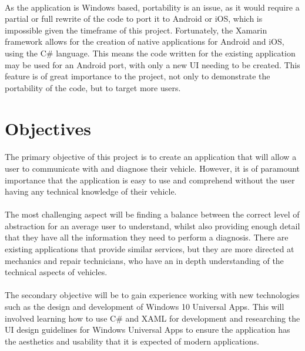 	\paragraph{}{
	As the application is Windows based, portability is an issue, as it would require a partial or full rewrite of the code to port it to Android or iOS, which is impossible given the timeframe of this project. Fortunately, the Xamarin framework allows for the creation of native applications for Android and iOS, using the C{\#} language. This means the code written for the existing application may be used for an Android port, with only a new UI needing to be created. This feature is of great importance to the project, not only to demonstrate the portability of the code, but to target more users.
	}
		
\section{Objectives}
	\paragraph{}{
	The primary objective of this project is to create an application that will allow a user to communicate with and diagnose their vehicle. However, it is of paramount importance that the application is easy to use and comprehend without the user having any technical knowledge of their vehicle.  
	}
	\paragraph{}{
	The most challenging aspect will be finding a balance between the correct level of abstraction for an average user to understand, whilst also providing enough detail that they have all the information they need to perform a diagnosis. There are existing applications that provide similar services, but they are more directed at mechanics and repair technicians, who have an in depth understanding of the technical aspects of vehicles.
	}
	\paragraph{}{
	The secondary objective will be to gain experience working with new technologies such as the design and development of Windows 10 Universal Apps. This will involved learning how to use C{\#} and XAML for development and researching the UI design guidelines for Windows Universal Apps to ensure the application has the aesthetics and usability that it is expected of modern applications.
	}
	
